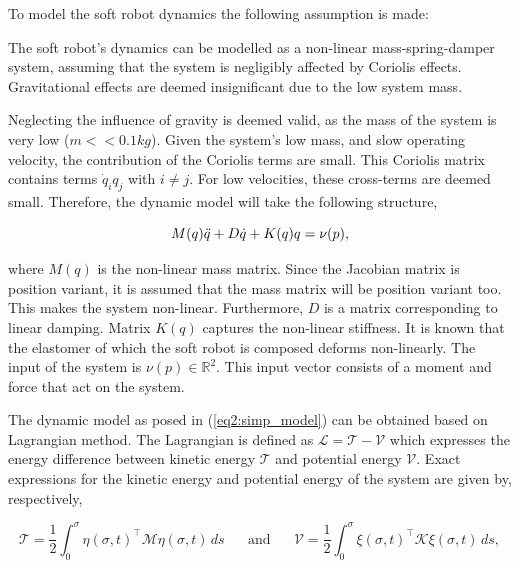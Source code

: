 To model the soft robot dynamics the following assumption is made:

\begin{theorem}
The soft robot's dynamics can be modelled as a non-linear mass-spring-damper system, assuming that the system is negligibly affected by Coriolis effects. Gravitational effects are deemed insignificant due to the low system mass.
\end{theorem}

Neglecting the influence of gravity is deemed valid, as the mass of the system is very low ($m << 0.1 kg$). Given the system's low mass, and slow operating velocity, the contribution of the Coriolis terms are small. This Coriolis matrix contains terms $\dot{q}_i q_j$ with $i \neq j$. For low velocities, these cross-terms are deemed small. Therefore, the dynamic model will take the following structure,


\begin{equation}
    M(q)\Ddot{q} + D\dot{q} + K(q)q = \nu(p),
    \label{eq2:simp_model}
\end{equation}


where $M(q)$ is the non-linear mass matrix. Since the Jacobian matrix is position variant, it is assumed that the mass matrix will be position variant too. This makes the system non-linear. Furthermore, $D$ is a matrix corresponding to linear damping. Matrix $K(q)$ captures the non-linear stiffness. It is known that the elastomer of which the soft robot is composed deforms non-linearly. The input of the system is $\nu(p) \in \mathbb{R}^2$. This input vector consists of a moment and force that act on the system. 

The dynamic model as posed in (\ref{eq2:simp_model}) can be obtained based on Lagrangian method. The Lagrangian is defined as $\mathcal{L} = \mathcal{T} -\mathcal{V}$ which expresses the energy difference between kinetic energy $\mathcal{T}$ and potential energy $\mathcal{V}$. Exact expressions for the kinetic energy and potential energy of the system are given by, respectively,

\begin{equation}
    \mathcal{T} = \frac{1}{2}\int_0^{\sigma} \eta(\sigma,t)^\top \mathcal{M} \eta(\sigma,t) \hspace{2pt} ds \hspace{20pt} \text{and} \hspace{20pt}  \mathcal{V} = \frac{1}{2}\int_0^{\sigma} \xi(\sigma,t)^\top \mathcal{K} \xi(\sigma,t)  \hspace{2pt} ds,
    \label{eq2:T}
\end{equation}


